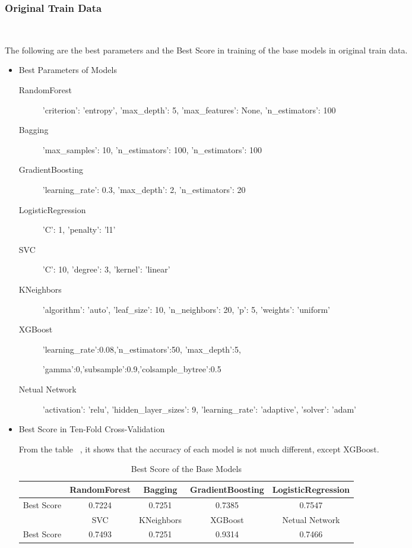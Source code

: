\subsubsection{Original Train Data}
\

The following are the best parameters and 
the Best Score in training of 
the base models 
in original train data. 

\begin{itemize}
	\item Best Parameters of Models
	\begin{description}
		\item[RandomForest] 'criterion': 'entropy', 'max_depth': 5, 
		'max_features': None, 'n_estimators': 100
		\item[Bagging] 'max_samples': 10, 'n_estimators': 100,
		'n_estimators': 100
		\item[GradientBoosting] 'learning_rate': 0.3, 'max_depth': 2, 
		'n_estimators': 20
		\item[LogisticRegression] 'C': 1, 'penalty': 'l1'
		\item[SVC] 'C': 10, 'degree': 3, 'kernel': 'linear'
		\item[KNeighbors] 'algorithm': 'auto', 'leaf_size': 10, 
		'n_neighbors': 20, 'p': 5, 'weights': 'uniform'
		\item[XGBoost] 'learning_rate':0.08,'n_estimators':50,
		'max_depth':5,
		
		'gamma':0,'subsample':0.9,'colsample_bytree':0.5
		\item[Netual Network] 'activation': 'relu', 'hidden_layer_sizes': 9, 
		'learning_rate': 'adaptive', 'solver': 'adam'
	\end{description}
	
	\item Best Score in Ten-Fold Cross-Validation
	
	From the table ~,
	it shows that the accuracy of 
	each model is not much different,
	except XGBoost.
	
	\begin{table}[h]  \centering
		\caption{Best Score of the Base Models}
		\label{tbl:best_score_base_models_old}
		\begin{tabular}{ccccc}
			\toprule
			& RandomForest & Bagging & GradientBoosting & 
			LogisticRegression \\
			\midrule
			Best Score & 0.7224 & 0.7251 & 0.7385 & 
			0.7547\\
			\bottomrule
			\toprule
			& SVC & KNeighbors & XGBoost & Netual Network\\
			\midrule
			Best Score & 0.7493 & 0.7251 & 0.9314 & 0.7466\\
			\bottomrule
		\end{tabular}
	\end{table}
\end{itemize}

